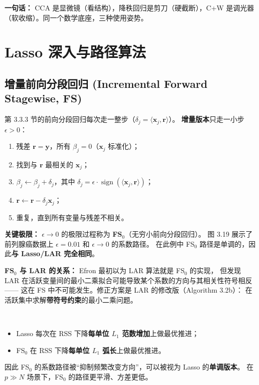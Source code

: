 \textbf{一句话：} CCA 是显微镜（看结构），降秩回归是剪刀（硬截断），C+W 是调光器（软收缩）。同一个数学底座，三种使用姿势。

\section{Lasso 深入与路径算法}

\subsection{增量前向分段回归 (Incremental Forward Stagewise, FS)}

第 3.3.3 节的前向分段回归每次走一整步（$\delta_j = \langle \mathbf{x}_j, \mathbf{r} \rangle$）。
\textbf{增量版本}只走一小步 $\epsilon > 0$：

\begin{enumerate}[label=第 \arabic* 步：, leftmargin=*]
    \item 残差 $\mathbf{r} = \mathbf{y}$，所有 $\beta_j = 0$（$\mathbf{x}_j$ 标准化）；
    \item 找到与 $\mathbf{r}$ 最相关的 $\mathbf{x}_j$；
    \item $\beta_j \leftarrow \beta_j + \delta_j$，其中 $\delta_j = \epsilon \cdot \operatorname{sign}(\langle \mathbf{x}_j, \mathbf{r} \rangle)$；
    \item $\mathbf{r} \leftarrow \mathbf{r} - \delta_j \mathbf{x}_j$；
    \item 重复，直到所有变量与残差不相关。
\end{enumerate}

\textbf{关键极限：} $\epsilon \to 0$ 的极限过程称为 \textbf{FS$_0$}（无穷小前向分段回归）。
图 3.19 展示了前列腺癌数据上 $\epsilon=0.01$ 和 $\epsilon \to 0$ 的系数路径。
在此例中 FS$_0$ 路径是单调的，因此\textbf{与 Lasso/LAR 完全相同}。

\textbf{FS$_0$ 与 LAR 的关系：} Efron 最初以为 LAR 算法就是 FS$_0$ 的实现，
但发现 LAR 在活跃变量间的最小二乘拟合可能导致某个系数的方向与其相关性符号相反——
这在 FS 中不可能发生。修正方案是 LAR 的修改版（Algorithm 3.2b）：
在活跃集中求解\textbf{带符号约束}的最小二乘问题。

\begin{definition}~{}

\begin{itemize}
    \item Lasso 每次在 RSS 下降\textbf{每单位 $L_1$ 范数增加}上做最优推进；
    \item FS$_0$ 在 RSS 下降\textbf{每单位 $L_1$ 弧长}上做最优推进。
\end{itemize}
因此 FS$_0$ 的系数路径被``抑制频繁改变方向''，可以被视为 Lasso 的\textbf{单调版本}。
在 $p \gg N$ 场景下，FS$_0$ 的路径更平滑、方差更低。
\end{definition}

